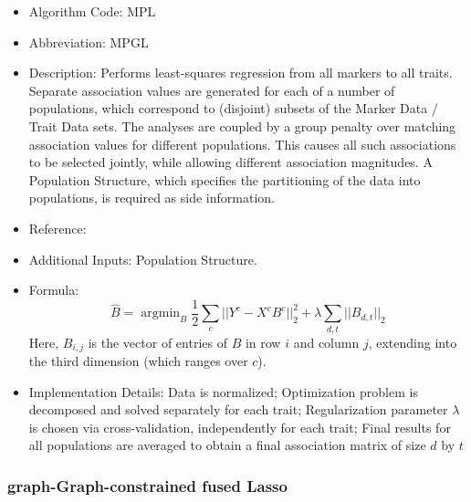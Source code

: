 \documentclass{article}
\newcommand{\argmin}{\operatorname{argmin}}
\begin{document}
\begin{itemize}
\item Algorithm Code: MPL 
\item Abbreviation: MPGL
\item Description: Performs least-squares regression from all markers to all traits. Separate association values are generated for each of a number of populations, which correspond to (disjoint) subsets of the Marker Data / Trait Data sets. The analyses are coupled by a group penalty over matching association values for different populations. This causes all such associations to be selected jointly, while allowing different association magnitudes. A Population Structure, which specifies the partitioning of the data into populations, is required as side information.
\item Reference: \cite{MPGL}
\item Additional Inputs: Population Structure.
\item Formula:
\begin{equation*}
\hat{B} = \argmin_{B} \frac{1}{2}\sum_c ||Y^c - X^cB^c||_2^2 + \lambda \sum_{d,t}||B_{d,t}||_2
\end{equation*}
Here, $B_{i,j}$ is the vector of entries of $B$ in row $i$ and column $j$, extending into the third dimension (which ranges over $c$).
\item Implementation Details: Data is normalized; Optimization problem is decomposed and solved separately for each trait; Regularization parameter $\lambda$ is chosen via cross-validation, independently for each trait; Final results for all populations are averaged to obtain a final association matrix of size $d$ by $t$
\end{itemize}

\subsubsection{graph-Graph-constrained fused Lasso}
\end{document}
